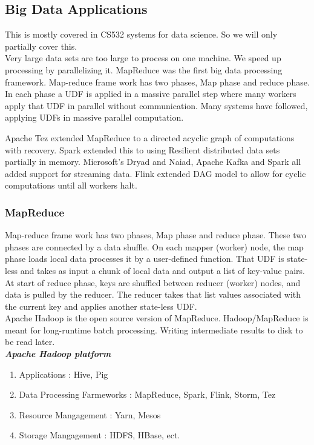 \documentclass[a4paper]{article}
\begin{document}
\subsection{Big Data Applications}

This is mostly covered in CS532 systems for data science. So we will only partially cover this.\\

Very large data sets are too large to process on one machine. We speed up processing by parallelizing it. MapReduce was the first big data processing framework. Map-reduce frame work has two phases, Map phase and reduce phase. In each phase a UDF is applied in a massive parallel step where many workers apply that UDF in parallel without communication. Many systems have followed, applying UDFs in massive parallel computation.

Apache Tez extended MapReduce to a directed acyclic graph of computations with recovery. Spark extended this to using Resilient distributed data sets partially in memory. Microsoft's Dryad and Naiad, Apache Kafka and Spark all added support for streaming data. Flink extended DAG model to allow for cyclic computations until all workers halt.

\subsubsection{MapReduce}

Map-reduce frame work has two phases, Map phase and reduce phase. These two phases are connected by a data shuffle. On each mapper (worker) node, the map phase loads local data processes it by a user-defined function. That UDF is state-less and takes as input a chunk of local data and output a list of key-value pairs. At start of reduce phase, keys are shuffled between reducer (worker) nodes, and data is pulled by the reducer. The reducer takes that list values associated with the current key and applies another state-less UDF.\\

Apache Hadoop is the open source version of MapReduce. Hadoop/MapReduce is meant for long-runtime batch processing. Writing intermediate results to disk to be read later.\\

\textit{\textbf{Apache Hadoop platform}}
\begin{enumerate}
\item Applications : Hive, Pig 
\item Data Processing Farmeworks : MapReduce, Spark, Flink, Storm, Tez
\item Resource Mangagement : Yarn, Mesos
\item Storage Mangagement : HDFS, HBase, ect.
\end{enumerate}
\end{document}
